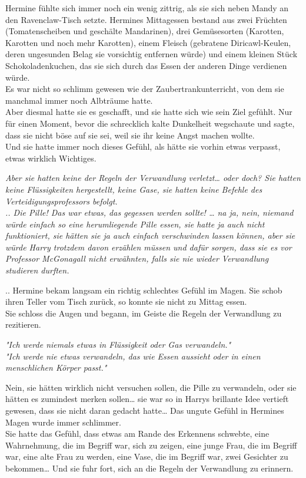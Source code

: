 {Hermine fühlte sich immer noch ein wenig zittrig, als sie sich neben Mandy an den Ravenclaw-Tisch setzte. Hermines Mittagessen bestand aus zwei Früchten (Tomatenscheiben und geschälte Mandarinen), drei Gemüsesorten (Karotten, Karotten und noch mehr Karotten), einem Fleisch (gebratene Diricawl-Keulen, deren ungesunden Belag sie vorsichtig entfernen würde) und einem kleinen Stück Schokoladenkuchen, das sie sich durch das Essen der anderen Dinge verdienen würde.\\ Es war nicht so schlimm gewesen wie der Zaubertrankunterricht, von dem sie manchmal immer noch Albträume hatte.\\ Aber diesmal hatte sie es geschafft, und sie hatte sich wie sein Ziel gefühlt. Nur für einen Moment, bevor die schrecklich kalte Dunkelheit wegschaute und sagte, dass sie nicht böse auf sie sei, weil sie ihr keine Angst machen wollte.\\ Und sie hatte immer noch dieses Gefühl, als hätte sie vorhin etwas verpasst, etwas wirklich Wichtiges.

\emph{Aber sie hatten keine der Regeln der Verwandlung verletzt… oder doch? Sie hatten keine Flüssigkeiten hergestellt, keine Gase, sie hatten keine Befehle des Verteidigungsprofessors befolgt.\\ .. Die Pille! Das war etwas, das gegessen werden sollte! … na ja, nein, niemand würde einfach so eine herumliegende Pille essen, sie hatte ja auch nicht funktioniert, sie hätten sie ja auch einfach verschwinden lassen können, aber sie würde Harry trotzdem davon erzählen müssen und dafür sorgen, dass sie es vor Professor McGonagall nicht erwähnten, falls sie nie wieder Verwandlung studieren durften.}

.. Hermine bekam langsam ein richtig schlechtes Gefühl im Magen. Sie schob ihren Teller vom Tisch zurück, so konnte sie nicht zu Mittag essen.\\ Sie schloss die Augen und begann, im Geiste die Regeln der Verwandlung zu rezitieren.

\emph{"Ich werde niemals etwas in Flüssigkeit oder Gas verwandeln."}\\ \emph{"Ich werde nie etwas verwandeln, das wie Essen aussieht oder in einen menschlichen Körper passt."}

Nein, sie hätten wirklich nicht versuchen sollen, die Pille zu verwandeln, oder sie hätten es zumindest merken sollen… sie war so in Harrys brillante Idee vertieft gewesen, dass sie nicht daran gedacht hatte… Das ungute Gefühl in Hermines Magen wurde immer schlimmer.\\ Sie hatte das Gefühl, dass etwas am Rande des Erkennens schwebte, eine Wahrnehmung, die im Begriff war, sich zu zeigen, eine junge Frau, die im Begriff war, eine alte Frau zu werden, eine Vase, die im Begriff war, zwei Gesichter zu bekommen… Und sie fuhr fort, sich an die Regeln der Verwandlung zu erinnern.

}
